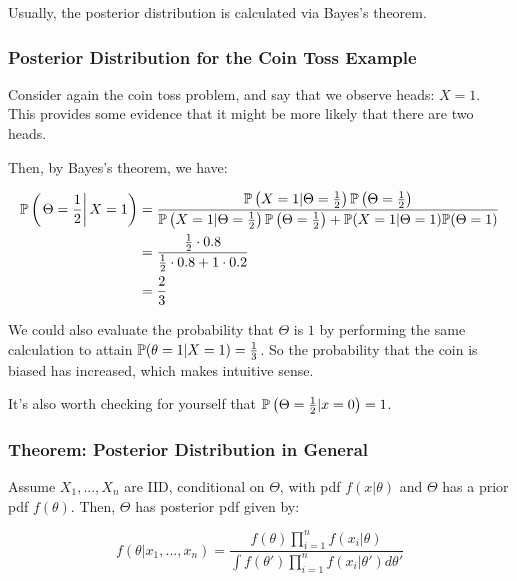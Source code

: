 \documentclass[a4paper]{article}
\begin{document}
            Usually, the posterior distribution is calculated via Bayes's
            theorem.

            \subsubsection{Posterior Distribution for the Coin Toss Example}
                Consider again the coin toss problem, and say that we observe
                heads: $X = 1$. This provides some evidence that it might be
                more likely that there are two heads.

                Then, by Bayes's theorem, we have:

                \begin{align*}
                    \mathbb{P}\left(\left.\Theta = \frac{1}{2} \right| X = 1\right)
                        & = \frac{\mathbb{P}\left(X = 1 | \Theta =
                        \frac{1}{2}\right) \mathbb{P}\left(\Theta =
                        \frac{1}{2}\right)}{\mathbb{P}\left(X = 1 | \Theta =
                        \frac{1}{2}\right)\mathbb{P}\left(\Theta = \frac{1}{2}
                        \right) + \mathbb{P}(X = 1 | \Theta = 1)\mathbb{P}(\Theta = 1)}
                        \\
                    & = \frac{\frac{1}{2} \cdot 0.8}{\frac{1}{2} \cdot 0.8 + 1
                        \cdot 0.2} \\
                    & = \frac{2}{3}
                \end{align*}

                We could also evaluate the probability that $\Theta$ is $1$ by
                performing the same calculation to attain $\mathbb{P}(\theta = 1 |
                X = 1) = \frac{1}{3}$. So the probability that the coin is
                biased has increased, which makes intuitive sense.

                It's also worth checking for yourself that $\mathbb{P}\left(\Theta =
                \frac{1}{2} | x = 0\right) = 1$.

            \subsubsection{Theorem: Posterior Distribution in General}
                Assume $X_1, ..., X_n$ are IID, conditional on $\Theta$, with
                pdf $f(x | \theta)$ and $\Theta$ has a prior pdf $f(\theta)$.
                Then, $\Theta$ has posterior pdf given by:

                \[
                    f(\theta | x_1, ..., x_n) = \frac{f(\theta)
                    \prod\limits_{i=1}^n f(x_i | \theta)}{\int f(\theta ')
                    \prod\limits_{i=1}^n f(x_i | \theta') d\theta'}
                \]
\end{document}
